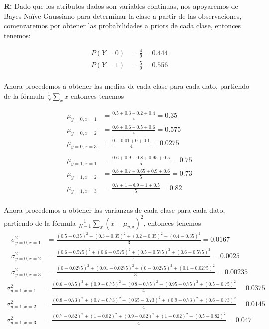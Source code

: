 \textbf{R:} Dado que los atributos dados son variables continuas, nos apoyaremos de Bayes Naïve Gaussiano para determinar la clase a partir de las observaciones, comenzaremos por obtener las probabilidades a priors de cada clase, entonces tenemos:

\begin{align*}
    P(Y=0)& = \frac{4}{9} = 0.444 \\
    P(Y=1) & = \frac{5}{9} = 0.556 \\
\end{align*}

Ahora procedemos a obtener las medias de cada clase para cada dato, partiendo de la fórmula $\frac{1}{N} \sum_{x} x$ entonces tenemos

\begin{align*}
    \mu_{y=0,x=1} & = \frac{0.5+0.3+0.2+0.4}{4} = 0.35 \\
    \mu_{y=0,x=2} & = \frac{0.6+0.6+0.5+0.6}{4} = 0.575 \\
    \mu_{y=0,x=3} & = \frac{0+0.01+0+0.1}{4} = 0.0275 \\\\
    \mu_{y=1,x=1} & = \frac{0.6+0.9+0.8+0.95+0.5}{5} = 0.75 \\
    \mu_{y=1,x=2} & = \frac{0.8+0.7+0.65+0.9+0.6}{5} = 0.73 \\
    \mu_{y=1,x=3} & = \frac{0.7+1+0.9+1+0.5}{5} = 0.82 \\
\end{align*}

Ahora procedemos a obtener las varianzas de cada clase para cada dato, partiendo de la fórmula $\frac{1}{N-1} \sum_{x} (x-\mu_{y,x})^2$, entonces tenemos
\begin{align*}
    \sigma^2_{y=0,x=1} & = \frac{(0.5-0.35)^2 + (0.3-0.35)^2 + (0.2-0.35)^2 + (0.4-0.35)^2}{3} = 0.0167 \\
    \sigma^2_{y=0,x=2} & = \frac{(0.6-0.575)^2 + (0.6-0.575)^2 + (0.5-0.575)^2 + (0.6-0.575)^2}{3} = 0.0025 \\
    \sigma^2_{y=0,x=3} & = \frac{(0-0.0275)^2 + (0.01-0.0275)^2 + (0-0.0275)^2 + (0.1-0.0275)^2}{3} = 0.00235
\end{align*}
\begin{align*}
    \sigma^2_{y=1,x=1} & = \frac{(0.6-0.75)^2 + (0.9-0.75)^2 + (0.8-0.75)^2 + (0.95-0.75)^2 + (0.5-0.75)^2}{4} = 0.0375 \\
    \sigma^2_{y=1,x=2} & = \frac{(0.8-0.73)^2 + (0.7-0.73)^2 + (0.65-0.73)^2 + (0.9-0.73)^2 + (0.6-0.73)^2}{4} = 0.0145 \\
    \sigma^2_{y=1,x=3} & = \frac{(0.7-0.82)^2 + (1-0.82)^2 + (0.9-0.82)^2 + (1-0.82)^2 + (0.5-0.82)^2}{4} = 0.047 \\
\end{align*}

